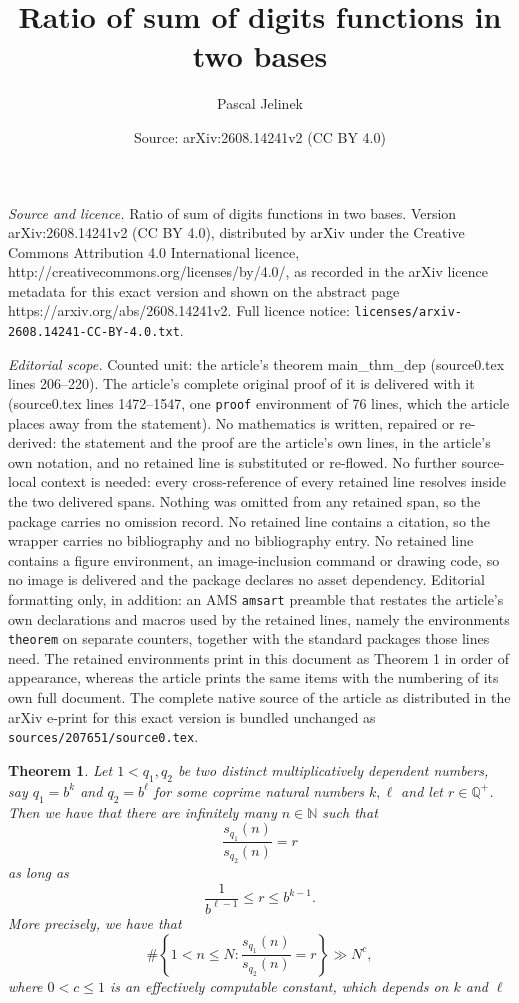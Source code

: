\documentclass[10pt,a4paper]{amsart}
\title{Ratio of sum of digits functions in two bases}
\author{Pascal Jelinek}
\date{Source: arXiv:2608.14241v2 (CC BY 4.0)}
\newtheorem{theorem}{Theorem}
\newcommand\NN{\mathbb{N}}
\newcommand\QQ{\mathbb{Q}}
\renewcommand{\leq}{\leqslant}
\begin{document}
\maketitle

\noindent\emph{Source and licence.} Ratio of sum of digits functions in two bases. Version arXiv:2608.14241v2 (CC BY 4.0), distributed by arXiv under the Creative Commons Attribution 4.0 International licence, http://creativecommons.org/licenses/by/4.0/, as recorded in the arXiv licence metadata for this exact version and shown on the abstract page https://arxiv.org/abs/2608.14241v2. Full licence notice: \texttt{licenses/arxiv-2608.14241-CC-BY-4.0.txt}.\par\smallskip

\noindent\textit{Editorial scope.} Counted unit: the article's theorem main\_thm\_dep (source0.tex lines 206--220). The article's complete original proof of it is delivered with it (source0.tex lines 1472--1547, one \texttt{proof} environment of 76 lines, which the article places away from the statement). No mathematics is written, repaired or re-derived: the statement and the proof are the article's own lines, in the article's own notation, and no retained line is substituted or re-flowed.  No further source-local context is needed: every cross-reference of every retained line resolves inside the two delivered spans.  Nothing was omitted from any retained span, so the package carries no omission record.  No retained line contains a citation, so the wrapper carries no bibliography and no bibliography entry.  No retained line contains a figure environment, an image-inclusion command or drawing code, so no image is delivered and the package declares no asset dependency.  Editorial formatting only, in addition: an AMS \texttt{amsart} preamble that restates the article's own declarations and macros used by the retained lines, namely the environments \texttt{theorem} on separate counters, together with the standard packages those lines need.  The retained environments print in this document as Theorem 1 in order of appearance, whereas the article prints the same items with the numbering of its own full document.  The complete native source of the article as distributed in the arXiv e-print for this exact version is bundled unchanged as \texttt{sources/207651/source0.tex}.
\begin{theorem}\label{main_thm_dep}
	Let $1<q_1,q_2$ be two distinct multiplicatively dependent numbers, say $q_1=b^k$ and $q_2=b^{\ell}$ for some coprime natural numbers $k,\ell$  and let $r\in \QQ^+$. Then we have that there are infinitely many $n\in \NN$ such that
	\[ 
		\frac{s_{q_1}(n)}{s_{q_2}(n)}=r
	\]
	as long as
	\[ 
		\frac{1}{b^{\ell-1}}\leq r \leq b^{k-1}.
	\]
More precisely, we have that
	\[
		\#\left\{1<n\leq N: \frac{s_{q_1}(n)}{s_{q_2}(n)}=r\right\} \gg N^{c},
	\]
	where $0<c\leq 1$ is an effectively computable constant, which depends on $k$ and $\ell$ 
\end{theorem}
\end{document}
